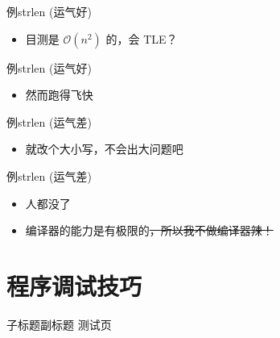 \documentclass[10pt,mathserif]{beamer}
\newcommand{\lstcode}[1] {  }
\newcommand{\lstterm}[1] {  }
\begin{document}
\begin{frame}[fragile]{例}{strlen (运气好)}
	\lstcode{strlen-1.cc}
	\begin{itemize}
		\item 目测是 $\mathcal{O}(n^2)$ 的，会 TLE？
	\end{itemize}
\end{frame}

\begin{frame}[fragile]{例}{strlen (运气好)}
	\lstterm{strlen-1.out}
	\begin{itemize}
		\item 然而跑得飞快
	\end{itemize}
\end{frame}

\begin{frame}[fragile]{例}{strlen (运气差)}
	\lstcode{strlen-2.cc}
	\begin{itemize}
		\item 就改个大小写，不会出大问题吧
	\end{itemize}
\end{frame}

\begin{frame}[fragile]{例}{strlen (运气差)}
	\lstterm{strlen-2.out}
	\begin{itemize}
		\item 人都没了
		\item 编译器的能力是有极限的\sout{，所以我不做编译器辣！}
	\end{itemize}
\end{frame}

\section{程序调试技巧}
\sectionpage

\begin{frame}{子标题}{副标题}
	测试页
\end{frame}

{\xdbg%
\begin{frame}
\end{frame}}
\end{document}

